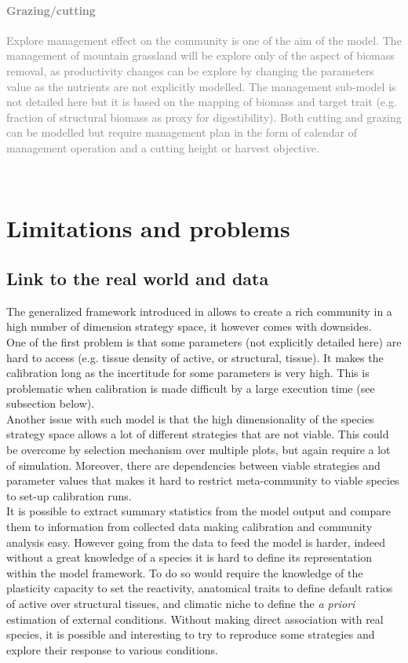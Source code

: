 \textcolor{gray}{\paragraph{Grazing/cutting} Explore management effect on the community is one of the aim of the \model model. The management of mountain grassland will be explore only of the aspect of biomass removal, as productivity changes can be explore by changing the parameters value as the nutrients are not explicitly modelled. The management sub-model is not detailed here but it is based on the mapping of biomass and target trait (e.g. fraction of structural biomass as proxy for digestibility). Both cutting and grazing can be modelled but require management plan in the form of calendar of management operation and a cutting height or harvest objective.}\\

\section{Limitations and problems}

\subsection{Link to the real world and data}
The generalized framework introduced in \model allows to create a rich community in a high number of dimension strategy space, it however comes with downsides.\\
\indent One of the first problem is that some parameters (not explicitly detailed here) are hard to access (e.g. tissue density of active, or structural, tissue). It makes the calibration long as the incertitude for some parameters is very high. This is problematic when calibration is made difficult by a large execution time (see subsection below).\\
\indent Another issue with such model is that the high dimensionality of the species strategy space allows a lot of different strategies that are not viable. This could be overcome by selection mechanism over multiple plots, but again require a lot of simulation. Moreover, there are dependencies between viable strategies and parameter values that makes it hard to restrict meta-community to viable species to set-up calibration runs.\\
\indent It is possible to extract summary statistics from the model output and compare them to information from collected data making calibration and community analysis easy. However going from the data to feed the model is harder, indeed without a great knowledge of a species it is hard to define its representation within the model framework. To do so would require the knowledge of the plasticity capacity to set the reactivity, anatomical traits to define default ratios of active over structural tissues, and climatic niche to define the \textit{a priori} estimation of external conditions. Without making direct association with real species, it is possible and interesting to try to reproduce some strategies and explore their response to various conditions.

